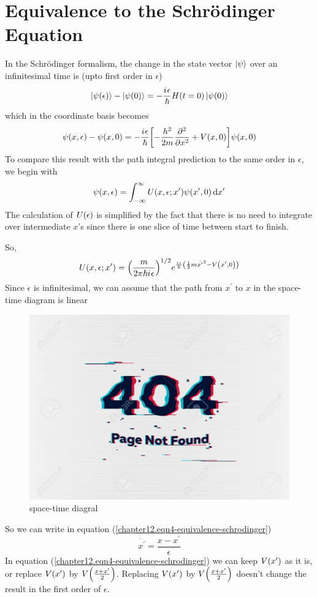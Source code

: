 	\section{Equivalence to the Schr\"{o}dinger Equation}
	In the Schr\"{o}dinger formalism, the change in the state vector $\ket{\psi}$ over an infinitesimal time is (upto first order in $\epsilon$)
	\begin{equation}
		\ket{\psi\qty(\epsilon)} - 		\ket{\psi\qty(0)} = - \frac{{i\mkern1mu} \epsilon}{\hbar} H\qty(t=0)\ket{\psi\qty(0)}
		\label{chapter12.eqn1-equivalence-schrodinger}
	\end{equation}
	which in the coordinate basis becomes
	\begin{equation}
		\psi\qty(x, \epsilon) - \psi\qty(x, 0) = - \frac{{i\mkern1mu} \epsilon}{\hbar}\qty[-\frac{h^2}{2 m}\pdv[2]{x} + V\qty(x, 0)] \psi\qty(x, 0)
		\label{chapter12.eqn2-equivalence-schrodinger}
	\end{equation}
	To compare this result with the path integral prediction to the same order in $\epsilon$, we begin with
	\begin{equation}
		\psi\qty(x, \epsilon) = \int_{-\infty}^{\infty} U(x, \epsilon; x^\prime) \psi\qty(x^\prime, 0) \dd{x^\prime}
		\label{chapter12.eqn3-equivalence-schrodinger}
	\end{equation}
	The calculation of $U\qty(\epsilon)$ is simplified by the fact that there is no need to integrate over intermediate $x$'s since there is one slice of time between start to finish.
	
	So,
	\begin{equation}
		U\qty(x, \epsilon; x^\prime) = \qty(\frac{m}{2\pi \hbar {i\mkern1mu} \epsilon})^{1/2} e^{\frac{{i\mkern1mu} \epsilon}{\hbar}\qty(\frac{1}{2} m \dot{x^\prime}^2 - V\qty(x^\prime, 0))}
		\label{chapter12.eqn4-equivalence-schrodinger}
	\end{equation}
	Since $\epsilon$ is infinitesimal, we can assume that the path from $x^\prime$ to $x$ in the space-time diagram is linear
	
	
	\begin{figure}
		\centering
		\includegraphics[width=0.5\linewidth]{Pictures/not-found.jpg}
		\caption{space-time diagral}
	\end{figure}
	So we can write in equation (\ref{chapter12.eqn4-equivalence-schrodinger})
	\begin{equation}
		\dot{x^\prime} = \frac{x-x^\prime}{\epsilon}
	\end{equation}
	In equation (\ref{chapter12.eqn4-equivalence-schrodinger}) we can keep $V\qty(x^\prime)$ as it is, or replace $V\qty(x^\prime)$ by $V\qty(\frac{x + x^\prime}{2})$. Replacing $V\qty(x^\prime)$ by $V\qty(\frac{x + x^\prime}{2})$ doesn't change the result in the first order of $\epsilon$.
	
